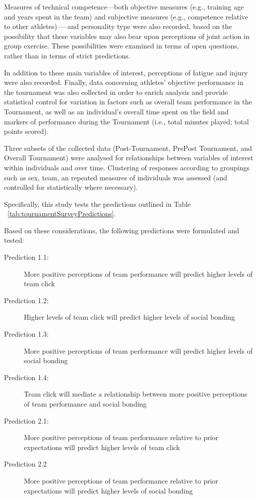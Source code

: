 \begin{CJK}{UTF8}{gbsn}
Measures of technical competence---both objective measures (e.g., training age and years spent in the team) and subjective measures (e.g., competence relative to other athletes)—--and personality type were also recorded, based on the possibility that these variables may also bear upon perceptions of joint action in group exercise.  These possibilities were examined in terms of open questions, rather than in terms of strict predictions.

In addition to these main variables of interest, perceptions of fatigue and injury were also recorded.  Finally, data concerning athletes’ objective performance in the tournament was also collected in order to enrich analysis and provide statistical control for variation in factors such as overall team performance in the Tournament, as well as an individual's overall time spent on the field and markers of performance during the Tournament (i.e., total minutes played; total points scored).

Three subsets of the collected data (Post-Tournament, PrePost Tournament, and Overall Tournament) were analysed for relationships between variables of interest within individuals and over time.  Clustering of responses according to groupings such as sex, team, an repeated measures of individuals was assessed (and controlled for statistically where necessary).

Specifically, this study tests the predictions outlined in Table ~\ref{tab:tournamentSurveyPredictions}.





Based on these considerations, the following predictions were formulated and tested:
      \begin{description}
        \item[Prediction 1.1:] More positive perceptions of team performance will predict higher levels of team click
        \item[Prediction 1.2:] Higher levels of team click will predict higher levels of social bonding
        \item[Prediction 1.3:] More positive perceptions of team performance will predict higher levels of social bonding
        \item[Prediction 1.4:] Team click will mediate a relationship between more positive perceptions of team performance and social bonding
        \item[Prediction 2.1:] More positive perceptions of team performance relative to prior expectations will predict higher levels of team click
        \item[Prediction 2.2] More positive perceptions of team performance relative to prior expectations will predict higher levels of social bonding
      \end{description}





\end{CJK}
